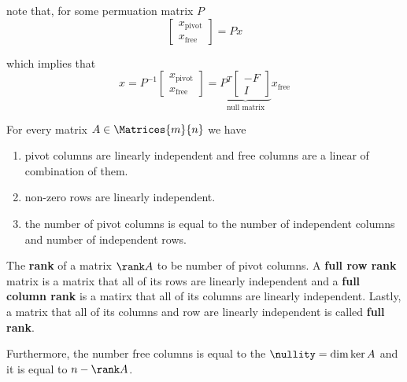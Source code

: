 \begin{example}
    note that, for some permuation matrix \(P\)
    \begin{equation*}
        \begin{bmatrix}
            x_{\mathrm{pivot}} \\
            x_{\mathrm{free}}
        \end{bmatrix} = Px
    \end{equation*}

    which implies that
    \begin{equation*}
        x = P^{-1} \begin{bmatrix}
            x_{\mathrm{pivot}} \\
            x_{\mathrm{free}}
        \end{bmatrix} =\underbrace{  P^T \begin{bmatrix}
                -F \\
                I
            \end{bmatrix}}_{\text{null matrix}} x_{\mathrm{free}}
    \end{equation*}
\end{example}

\begin{proposition}
    For every matrix \(A \in \Matrices{m}{n}\) we have
    \begin{enumerate}
        \item pivot columns are linearly independent and free columns are a linear of combination of them.
        \item non-zero rows are linearly independent.
        \item the number of pivot columns is equal to the number of independent columns and number of independent rows.
    \end{enumerate}
\end{proposition}

\begin{definition}
    The \textbf{rank} of a matrix \(\rank A\) to be number of pivot columns. A \textbf{full row rank} matrix is a matrix that all of its rows are linearly independent and a \textbf{full column rank} is a matirx that all of its columns are linearly independent. Lastly, a matrix that all of its columns and row are linearly independent is called \textbf{full rank}.

    Furthermore, the number free columns is equal to the \(\nullity = \dim \ker A\) and it is equal to \(n - \rank A\).
\end{definition}

